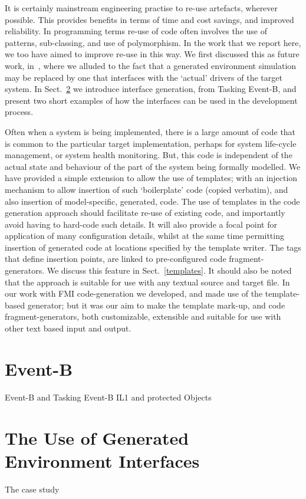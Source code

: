 \documentclass{llncs}%
\begin{document}
It is certainly mainstream engineering practise to re-use artefacts, wherever possible. This provides benefits in terms of time and cost savings, and improved reliability. In programming terms re-use of code often involves the use of patterns, sub-classing, and use of polymorphism. In the work that we report here, we too have aimed to improve re-use in this way. We first discussed this as future work, in~\cite{ae2011a}, where we alluded to the fact that a generated environment simulation may be replaced by one that interfaces with the `actual' drivers of the target system. In Sect.~\ref{interfaces} we introduce interface generation, from Tasking Event-B, and present two short examples of how the interfaces can be used in the development process.

Often when a system is being implemented, there is a large amount of code that is common to the particular target implementation, perhaps for system life-cycle management, or system health monitoring. But, this code is independent of the actual state and behaviour of the part of the system being formally modelled. We have provided a simple extension to allow the use of templates; with an injection mechanism to allow insertion of  such `boilerplate' code (copied verbatim), and also insertion of model-specific, generated, code.  The use of templates in the code generation approach should facilitate re-use of existing code, and importantly avoid having to hard-code such details. It will also provide a focal point for application of many configuration details, whilst at the same time permitting insertion of generated code at locations specified by the template writer. The tags that define insertion points, are linked to pre-configured code fragment-generators. We discuss this feature in Sect.~\ref{templates}. It should also be noted that the approach is suitable for use with any textual source and target file. In our work with FMI code-generation we developed, and made use of the template-based generator; but it was our aim to make the template mark-up, and code fragment-generators, both customizable, extensible and suitable for use with other text based input and output.  
%
\section{Event-B }
%
Event-B and Tasking Event-B
%
IL1 and protected Objects
%
\section{The Use of Generated Environment Interfaces}\label{interfaces}
%
%
The case study
%
%
%
\end{document}
